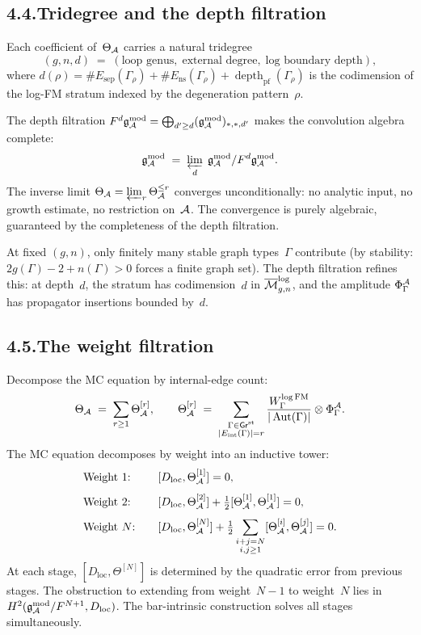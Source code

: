 \subsection*{4.4.\enspace Tridegree and the depth filtration}

Each coefficient of~$\Theta_{\mathcal{A}}$ carries a natural tridegree
\[
(g,n,d)
\;=\;
(\text{loop genus},\;\text{external degree},\;
\text{log boundary depth}),
\]
where $d(\rho)=\#E_{\mathrm{sep}}(\Gamma_\rho)+
\#E_{\mathrm{ns}}(\Gamma_\rho)+\operatorname{depth}_{\mathrm{pf}}
(\Gamma_\rho)$ is the codimension of the log-FM stratum indexed by
the degeneration pattern~$\rho$.

The depth filtration
$F^d\mathfrak{g}_{\mathcal{A}}^{\mathrm{mod}}=\bigoplus_{d'\ge d}(\mathfrak{g}_{\mathcal{A}}^{\mathrm{mod}})_{*,*,d'}$ makes
the convolution algebra complete:
\[
\mathfrak{g}_{\mathcal{A}}^{\mathrm{mod}}\;=\;\varprojlim_{d}\;\mathfrak{g}_{\mathcal{A}}^{\mathrm{mod}}/F^d\mathfrak{g}_{\mathcal{A}}^{\mathrm{mod}}.
\]
The inverse limit
$\Theta_{\mathcal{A}}=\varprojlim_r\Theta_{\mathcal{A}}^{\le r}$ converges
unconditionally: no analytic input, no growth estimate, no
restriction on~$\mathcal{A}$. The convergence is purely algebraic,
guaranteed by the completeness of the depth filtration.

At fixed $(g,n)$, only finitely many stable graph types~$\Gamma$
contribute (by stability: $2g(\Gamma)-2+n(\Gamma)>0$ forces a finite
graph set). The depth filtration refines this: at depth~$d$,
the stratum has codimension~$d$ in $\overline{\mathcal{M}}_{g,n}^{\log}$,
and the amplitude $\Phi^{\mathcal{A}}_\Gamma$ has propagator insertions
bounded by~$d$.

\subsection*{4.5.\enspace The weight filtration}

Decompose the MC equation by internal-edge count:
\[
\Theta_{\mathcal{A}}\;=\;\sum_{r\ge 1}\Theta^{[r]}_{\mathcal{A}},
\qquad
\Theta^{[r]}_{\mathcal{A}}\;=\;
\sum_{\substack{\Gamma\in\mathsf{Gr}^{\mathrm{st}}\\
|E_{\mathrm{int}}(\Gamma)|=r}}
\frac{W^{\log\mathrm{FM}}_\Gamma}{|\operatorname{Aut}(\Gamma)|}
\otimes\Phi^{\mathcal{A}}_\Gamma.
\]
The MC equation decomposes by weight into an inductive tower:
\begin{alignat*}{2}
&\text{Weight }1{:}\quad
&&[D_{\mathrm{loc}},\Theta^{[1]}_{\mathcal{A}}]=0,\\[4pt]
&\text{Weight }2{:}\quad
&&[D_{\mathrm{loc}},\Theta^{[2]}_{\mathcal{A}}]
+\tfrac12[\Theta^{[1]}_{\mathcal{A}},\Theta^{[1]}_{\mathcal{A}}]=0,\\[4pt]
&\text{Weight }N{:}\quad
&&[D_{\mathrm{loc}},\Theta^{[N]}_{\mathcal{A}}]
+\tfrac12\sum_{\substack{i+j=N\\i,j\ge 1}}
[\Theta^{[i]}_{\mathcal{A}},\Theta^{[j]}_{\mathcal{A}}]=0.
\end{alignat*}
At each stage, $[D_{\mathrm{loc}},\Theta^{[N]}]$ is determined by
the quadratic error from previous stages. The obstruction to
extending from weight~$N-1$ to weight~$N$ lies in
$H^2(\mathfrak{g}_{\mathcal{A}}^{\mathrm{mod}}/F^{N+1},D_{\mathrm{loc}})$. The bar-intrinsic
construction solves all stages simultaneously.

